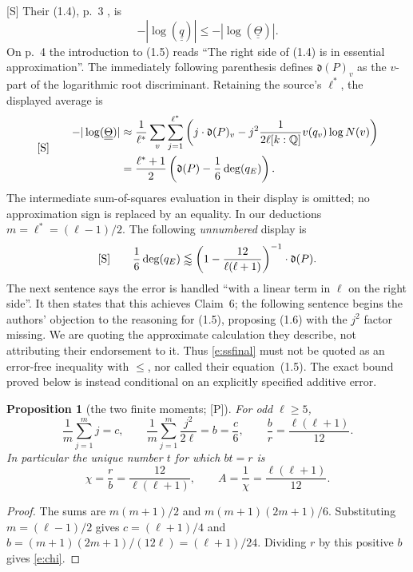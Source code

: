 \documentclass[11pt]{article}
\newtheorem{proposition}{Proposition}
\theoremstyle{remark}
\newcommand{\qpilot}{\underline{\underline{q}}}
\newcommand{\thetapilot}{\underline{\underline{\Theta}}}
\newcommand{\Smark}{\textup{[S]}}
\newcommand{\Pmark}{\textup{[P]}}
\begin{document}
\Smark{} Their (1.4), p.~3 \cite[p.~3, (1.4); p.~4, (1.5)]{SS}, is
\begin{equation}\label{e:ss14}
 -|\log(\qpilot)|\le -|\log(\thetapilot)|.
\end{equation}
On p.~4 the introduction to (1.5) reads
``The right side of (1.4) is in essential approximation''.
The immediately following parenthesis defines $\mathfrak d(P)_v$ as the
$v$-part of the logarithmic root discriminant.  Retaining the source's
$\ell^*$, the displayed average is
\begin{equation}\label{e:ss15}
 \Smark\qquad
 \begin{aligned}
 -|\log(\thetapilot)|&\approx
 \frac1{\ell^*}\sum_v\sum_{j=1}^{\ell^*}
 \left(j\cdot\mathfrak d(P)_v-
 j^2\frac1{2\ell[k:\mathbb Q]}v(q_v)\log N(v)\right)
 \\&=\frac{\ell^*+1}{2}\left(\mathfrak d(P)-\frac16\deg(q_E)\right).
 \end{aligned}
\end{equation}
The intermediate sum-of-squares evaluation in their display is omitted;
no approximation sign is replaced by an equality.  In our deductions
$m=\ell^*=(\ell-1)/2$.  The following \emph{unnumbered} display is
\begin{equation}\label{e:ssfinal}
 \Smark\qquad
 \frac16\deg(q_E)\lessapprox
 \left(1-\frac{12}{\ell(\ell+1)}\right)^{-1}\cdot\mathfrak d(P).
\end{equation}
The next sentence says the error is handled
``with a linear term in $\ell$ on the right side''.
It then states that this achieves Claim~6; the following sentence begins
the authors' objection to the reasoning for (1.5), proposing (1.6) with
the $j^2$ factor missing.  We are quoting the approximate calculation
they describe, not attributing their endorsement to it.
Thus \eqref{e:ssfinal} must not be quoted as an
error-free inequality with $\le$, nor called their equation~(1.5).
The exact bound proved below is instead conditional on an explicitly
specified additive error.

\begin{proposition}[the two finite moments; \Pmark]\label{p:moments}
For odd $\ell\ge5$,
\[
 \frac1m\sum_{j=1}^m j=c,\qquad
 \frac1m\sum_{j=1}^m\frac{j^2}{2\ell}=b=\frac c6,
 \qquad \frac br=\frac{\ell(\ell+1)}{12}.
\]
In particular the unique number $t$ for which $bt=r$ is
\begin{equation}\label{e:chi}
 \chi=\frac rb=\frac{12}{\ell(\ell+1)},\qquad
 A=\frac1\chi=\frac{\ell(\ell+1)}{12}.
\end{equation}
\end{proposition}
\begin{proof}
The sums are $m(m+1)/2$ and $m(m+1)(2m+1)/6$.
Substituting $m=(\ell-1)/2$ gives $c=(\ell+1)/4$ and
$b=(m+1)(2m+1)/(12\ell)=(\ell+1)/24$.
Dividing $r$ by this positive $b$ gives \eqref{e:chi}.
\end{proof}
\end{document}
